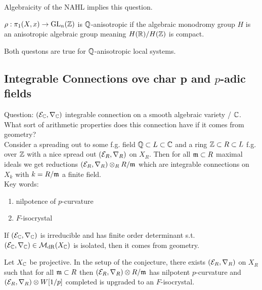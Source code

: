 \documentclass[12pt]{article}
\begin{document}
\begin{rmk}
Algebraicity of the NAHL implies this question.
\end{rmk}

\begin{defn}
$\rho : \pi_1(X, x) \to \mathrm{GL}_n(\mathbb{Z})$ is $\mathbb{Q}$-anisotropic if the algebraic monodromy group $H$ is an anisotropic algebraic group meaning $H(\mathbb{R}) / H(\mathbb{Z})$ is compact.
\end{defn}

\begin{theorem}
Both questons are true for $\mathbb{Q}$-anisotropic local systems. 
\end{theorem}

\subsection{Integrable Connections ove char p and $p$-adic fields}

Question: $(\mathcal{E}_{\mathbb{C}}, \nabla_{\mathbb{C}})$ integrable connection on a smooth algebraic variety / $\mathbb{C}$. What sort of arithmetic properties does this connection have if it comes from geometry? 
\\
Consider a spreading out to some f.g. field $\mathbb{Q} \subset L \subset \mathbb{C}$ and a ring $\mathbb{Z} \subset R \subset L$ f.g. over $\mathbb{Z}$ with a nice spread out $(\mathcal{E}_R, \nabla_R)$ on $X_R$. Then for all $\mathfrak{m} \subset R$ maximal ideals we get reductions $(\mathcal{E}_R, \nabla_R) \otimes_R R / \mathfrak{m}$ which are integrable connections on $X_k$ with $k = R / \mathfrak{m}$ a finite field. 
\\
Key words:
\begin{enumerate}
\item nilpotence of $p$-curvature
\item $F$-isocrystal
\end{enumerate}

\begin{conj}[Simpson]
If $(\mathcal{E}_{\mathbb{C}}, \nabla_{\mathbb{C}})$ is irreducible and has finite order determinant s.t. $(\mathcal{E}_{\mathbb{C}}, \nabla_{\mathbb{C}}) \in \mathcal{M}_{\mathrm{dR}}(X_{\mathbb{C}})$ is isolated, then it comes from geometry. 
\end{conj}

\begin{theorem}
Let $X_{\mathbb{C}}$ be projective. In the setup of the conjecture, there exists $(\mathcal{E}_R, \nabla_R)$ on $X_R$ such that for all $\mathfrak{m} \subset R$ then $(\mathcal{E}_R, \nabla_R) \otimes R / \mathfrak{m}$ has nilpotent $p$-curvature and $(\mathcal{E}_R, \nabla_R) \otimes W[1/p]$ completed is upgraded to an $F$-isocrystal. 
\end{theorem}
\end{document}
